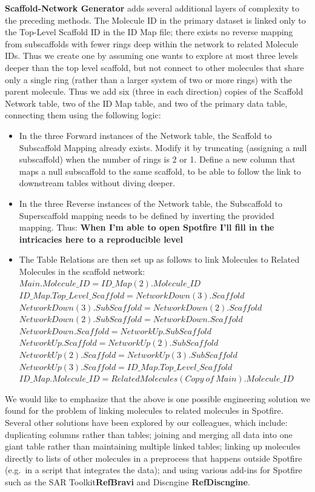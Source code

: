 \documentclass[journal=jacsat,manuscript=article]{achemso}
\newcommand*\eg{e.g.~}
\begin{document}
{\bf Scaffold-Network Generator} adds several additional layers of complexity to the preceding methods. The Molecule ID in the primary dataset is linked only to the Top-Level Scaffold ID in the ID Map file; there exists no reverse mapping from subscaffolds with fewer rings deep within the network to related Molecule IDs. Thus we create one by assuming one wants to explore at most three levels deeper than the top level scaffold, but not connect to other molecules that share only a single ring (rather than a larger system of two or more rings) with the parent molecule. Thus we add six (three in each direction) copies of the Scaffold Network table, two of the ID Map table, and two of the primary data table, connecting them using the following logic:
\begin{itemize}
\item In the three Forward instances of the Network table, the Scaffold to Subscaffold Mapping already exists. Modify it by truncating (assigning a null subscaffold) when the number of rings is 2 or 1. 
\subitem Define a new column that maps a null subscaffold to the same scaffold, to be able to follow the link to downstream tables without diving deeper.
\item In the three Reverse instances of the Network table, the Subscaffold to Superscaffold mapping needs to be defined by inverting the provided mapping. Thus:
\subitem \textbf{When I'm able to open Spotfire I'll fill in the intricacies here to a reproducible level}
\item The Table Relations are then set up as follows to link Molecules to Related Molecules in the scaffold network:    
\subitem $Main.Molecule\_ID = ID\_Map(2).Molecule\_ID$
\subitem $ID\_Map.Top\_Level\_Scaffold = NetworkDown(3).Scaffold$
\subitem $NetworkDown(3).SubScaffold = NetworkDown(2).Scaffold$
\subitem $NetworkDown(2).SubScaffold = NetworkDown.Scaffold$
\subitem $NetworkDown.Scaffold = NetworkUp.SubScaffold$
\subitem $NetworkUp.Scaffold = NetworkUp(2).SubScaffold$
\subitem $NetworkUp(2).Scaffold = NetworkUp(3).SubScaffold$
\subitem $NetworkUp(3).Scaffold = ID\_Map.Top\_Level\_Scaffold$
\subitem $ID\_Map.Molecule\_ID = Related Molecules(Copy~of~Main).Molecule\_ID$ 
\end{itemize}   

We would like to emphasize that the above is one possible engineering solution we found for the problem of linking molecules to related molecules in Spotfire.  Several other solutions have been explored by our colleagues, which include: duplicating columns rather than tables; joining and merging all data into one giant table rather than maintaining multiple linked tables; linking up molecules directly to lists of other molecules in a preprocess that happens outside Spotfire (\eg in a script that integrates the data); and using various add-ins for Spotfire such as the SAR Toolkit{\bf RefBravi} and Discngine {\bf RefDiscngine}.
 
\end{document}
